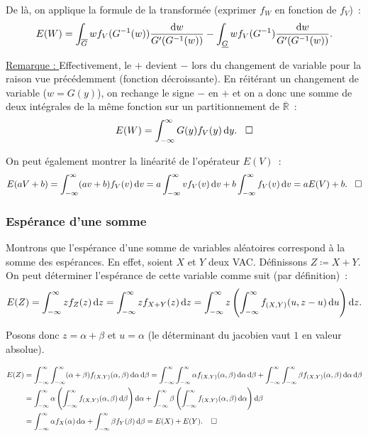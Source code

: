 \documentclass{article}
\begin{document}
		De là, on applique la formule de la transformée (exprimer $f_W$ en fonction de $f_V$)~:
		\[E(W) = \int_{\overline G}wf_V(G^{-1}(w))\frac {\dif w}{G'(G^{-1}(w))} - \int_{\underline G}wf_V(G^{-1})\frac {\dif w}{G'(G^{-1}(w))}.\]

		\underline {Remarque : } Effectivement, le $+$ devient $-$ lors du changement de variable pour la raison vue précédemment (fonction décroissante).
		En réitérant un changement de variable ($w = G(y)$), on rechange le signe $-$ en $+$ et on a donc une somme de deux intégrales de la même fonction sur un
		partitionnement de $\overline {\mathbb R}$~:
		\[E(W) = \int_{-\infty}^\infty G(y)f_V(y)\dif y. \;\;\;\square\]

		On peut également montrer la linéarité de l'opérateur $E(V)$~:
		\[E(aV + b) = \int_{-\infty}^\infty(av+b)f_V(v)\dif v = a\int_{-\infty}^\infty vf_V(v)\dif v + b\int_{-\infty}^\infty f_V(v)\dif v = aE(V) + b. \;\;\;\square\]

		\subsubsection{Espérance d'une somme}
			Montrons que l'espérance d'une somme de variables aléatoires correspond à la somme des espérances. En effet, soient $X$ et $Y$ deux VAC. Définissons
			$Z \coloneqq X+Y$. On peut déterminer l'espérance de cette variable comme suit (par définition)~:
			\[E(Z) = \int_{-\infty}^\infty zf_Z(z)\dif z = \int_{-\infty}^\infty zf_{X+Y}(z)\dif z =
				\int_{-\infty}^\infty z\left(\int_{-\infty}^\infty f_{(X, Y)}(u, z-u)\dif u\right)\dif z.\]

			Posons donc $z = \alpha + \beta$ et $u = \alpha$ (le déterminant du jacobien vaut $1$ en valeur absolue).

			\begin{align*}
				E(Z) &= \int_{-\infty}^\infty\int_{-\infty}^\infty(\alpha + \beta)f_{(X, Y)}(\alpha, \beta) \dif \alpha \dif \beta
					= \int_{-\infty}^\infty\int_{-\infty}^\infty\alpha f_{(X, Y)}(\alpha, \beta)\dif\alpha\dif\beta + \int_{-\infty}^\infty\int_{-\infty}^\infty\beta f_{(X, Y)}(\alpha, \beta)\dif\alpha\dif\beta \\
				&= \int_{-\infty}^\infty\alpha\left(\int_{-\infty}^\infty f_{(X, Y)}(\alpha, \beta)\dif\beta\right)\dif\alpha + \int_{-\infty}^\infty\beta\left(\int_{-\infty}^\infty f_{(X, Y)}(\alpha, \beta)\dif\alpha\right)\dif\beta \\
				&= \int_{-\infty}^\infty\alpha f_X(\alpha)\dif\alpha + \int_{-\infty}^\infty\beta f_Y(\beta)\dif\beta = E(X) + E(Y).\;\;\;\;\square
			\end{align*}
\end{document}
